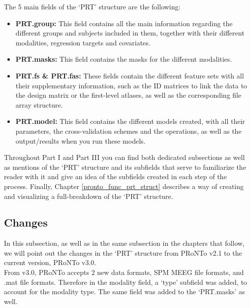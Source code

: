 The 5 main fields of the `PRT' structure are the following:
\begin{itemize}
    \item \textbf{PRT.group:} This field contains all the main information regarding the different groups and subjects included in them, together with their different modalities, regression targets and covariates.
    
    \item \textbf{PRT.masks:} This field contains the masks for the different modalities.
    
    \item \textbf{PRT.fs \& PRT.fas:} These fields contain the different feature sets with all their supplementary information, such as the ID matrices to link the data to the design matrix or the first-level atlases, as well as the corresponding file array structure.
    
    \item \textbf{PRT.model:} This field contains the different models created, with all their parameters, the cross-validation schemes and the operations, as well as the output/results when you run these models.
    
\end{itemize}

Throughout Part I and Part III you can find both dedicated subsections as well as mentions of the `PRT' structure and its subfields that serve to familiarize the reader with it and give an idea of the subfields created in each step of the process. Finally, Chapter \ref{pronto_func_prt_struct} describes a way of creating and visualizing a full-breakdown of the `PRT' structure.

\subsection{Changes}

In this subsection, as well as in the same subsection in the chapters that follow, we will point out the changes in the `PRT' structure from PRoNTo v2.1 to the current version, PRoNTo v3.0.
\\[0.2cm]

From v3.0, PRoNTo accepts 2 new data formats, SPM MEEG file formats, and .mat file formats. Therefore in the modality field, a `type' subfield was added, to account for the modality type. The same field was added to the `PRT.masks' as well.
\\[0.3cm]



